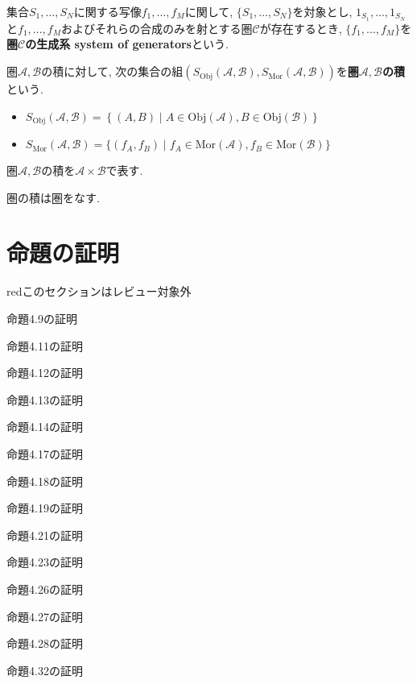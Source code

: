 \begin{comment}
\begin{proof}
\end{proof}
\end{comment}
\begin{Def}
集合$S_1,\dots,S_N$に関する写像$f_1,\dots,f_M$に関して,
$\{S_1,\dots,S_N\}$を対象とし,
$1_{S_1},\dots,1_{S_N}$と$f_1,\dots,f_M$およびそれらの合成のみを射とする圏$\mathscr{C}$が存在するとき, $\{f_1,\dots,f_M\}$を{\bf 圏$\mathscr{C}$の生成系 system of generators}という.
\end{Def}
\begin{Def}
圏$\mathscr{A},\mathscr{B}$の積に対して, 次の集合の組$(S_{\mathrm{Obj}}\left(\mathscr{A},\mathscr{B}\right),S_{\mathrm{Mor}}\left(\mathscr{A},\mathscr{B}\right))$を{\bf 圏$\mathscr{A},\mathscr{B}$の積}という.
\begin{itemize}
\item $S_{\mathrm{Obj}}\left(\mathscr{A},\mathscr{B}\right)
=\left\{(A,B)\mid A\in\mathrm{Obj}(\mathscr{A}),B\in\mathrm{Obj}(\mathscr{B})\right\}$
\item $S_{\mathrm{Mor}}\left(\mathscr{A},\mathscr{B}\right)
=\{(f_A,f_B)\mid f_A\in\mathrm{Mor(\mathscr{A})},
f_B\in\mathrm{Mor(\mathscr{B})}\}$
\end{itemize}
\end{Def}
\begin{Def}
圏$\mathscr{A},\mathscr{B}$の積を$\mathscr{A}\times\mathscr{B}$で表す.
\end{Def}
\begin{Prop}
圏の積は圏をなす.
\end{Prop}
\begin{comment}
\begin{proof}
\end{proof}
\end{comment}

\section{命題の証明}
\begin{color}{red}このセクションはレビュー対象外\end{color}

命題4.9の証明

命題4.11の証明

命題4.12の証明

命題4.13の証明

命題4.14の証明

命題4.17の証明

命題4.18の証明

命題4.19の証明

命題4.21の証明

命題4.23の証明

命題4.26の証明

命題4.27の証明

命題4.28の証明

命題4.32の証明